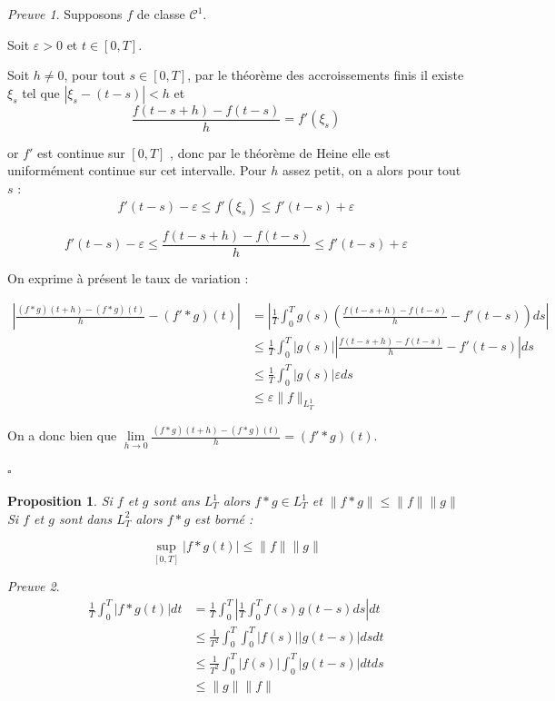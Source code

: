 \documentclass[]{article}
\newtheorem{myproposition}{Proposition}
\theoremstyle{remark}
\newtheorem{myproof}{Preuve}
\theoremstyle{definition}
\newcommand{\cqfd}{
	\hfill$\square$
}
\begin{document}
\begin{myproof}
	Supposons $f$ de classe $\mathcal{C}^1$.
	
	Soit $\varepsilon > 0$ et $t \in [0, T]$. 
	
	Soit $h \neq 0$, pour tout $s \in  [0, T]$, par le théorème des accroissements finis il existe $\xi_s$ tel que $|\xi_s - (t-s)| < h$ et
	$$\frac{f(t - s + h) - f(t - s)}{h} = f'(\xi_s)$$
	
	or $f'$ est continue sur $[0, T]$ , donc par le théorème de Heine elle est uniformément continue sur cet intervalle. Pour $h$ assez petit, on a alors pour tout $s$ : $$f'(t-s) - \varepsilon \leqslant f'(\xi_s) \leqslant f'(t-s)+ \varepsilon$$
	
	$$f'(t-s) - \varepsilon \leqslant \frac{f(t - s + h) - f(t - s)}{h} \leqslant f'(t-s) + \varepsilon$$
	
	On exprime à présent le taux de variation :
	
	$$\begin{aligned}
	\left|\frac{(f * g)(t + h) - (f*g)(t)}{h} - (f'*g)(t)\right| &= \left|\frac{1}{T} \int_0^T g(s) \left(\frac{f(t-s+h) - f(t-s)}{h} - f'(t-s)\right)ds\right|\\
	& \leqslant \frac{1}{T} \int_0^T |g(s)| \left|\frac{f(t-s+h) - f(t-s)}{h} - f'(t-s)\right|ds \\
	&\leqslant \frac{1}{T} \int_0^T |g(s)| \varepsilon ds \\
	&\leqslant \varepsilon \|f\|_{L_T^1}
	\end{aligned}
	$$
	
	On a donc bien que $\displaystyle \lim\limits_{h \to 0} \frac{(f*g)(t + h) - (f*g)(t)}{h} = (f'*g)(t)$.
	
	\cqfd
\end{myproof}

\begin{myproposition}
	Si $f$ et $g$ sont ans $L^1_T$ alors $f * g \in L_T^1$ et $\|f * g\| \leqslant \|f\| \|g\|$
	Si $f$ et $g$ sont dans $L_T^2$ alors $f *g$ est borné :
	
	$$\sup_{[0, T]} |f * g(t)| \leqslant \|f\| \|g\|$$
\end{myproposition}

\begin{myproof}
	$$\begin{aligned}
	\frac{1}{T} \int_{0}^{T} |f * g (t)| dt &= \frac{1}{T} \int_{0}^{T} \left|\frac{1}{T} \int_{0}^{T} f(s) g(t - s) ds\right|dt \\
	&\leqslant \frac{1}{T^2} \int_{0}^{T} \int_{0}^{T} |f(s)| |g(t - s)| ds dt \\
	&\leqslant \frac{1}{T^2} \int_{0}^{T} |f(s)| \int_{0}^{T} |g(t - s)|dt ds \\
	&\leqslant \|g\| \|f\|
	\end{aligned}$$
\end{myproof}
\end{document}

